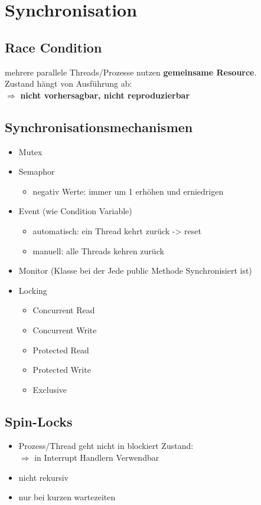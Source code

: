 \section{Synchronisation}

\subsection{Race Condition}
mehrere parallele Threads/Prozesse nutzen \textbf{gemeinsame Resource}.\\
Zustand hängt von Ausführung ab:\\
$\Rightarrow$ \textbf{nicht vorhersagbar, nicht reproduzierbar}

\subsection{Synchronisationsmechanismen}
\begin{itemize}
    \item Mutex
    \item Semaphor
    \begin{itemize}
        \item negativ Werte: immer um 1 erhöhen und erniedrigen
    \end{itemize}
    \item Event (wie Condition Variable)
    \begin{itemize}
        \item automatisch: ein Thread kehrt zurück -> reset
        \item manuell: alle Threads kehren zurück
    \end{itemize}
    \item Monitor (Klasse bei der Jede public Methode Synchronisiert ist)
    \item Locking
    \begin{itemize}
        \item Concurrent Read
        \item Concurrent Write
        \item Protected Read
        \item Protected Write
        \item Exclusive
    \end{itemize}
\end{itemize}

\subsection{Spin-Locks}
\begin{itemize}
    \item Prozess/Thread geht nicht in blockiert Zustand:\\
    $\Rightarrow$ in Interrupt Handlern Verwendbar
    \item nicht rekursiv
    \item nur bei kurzen wartezeiten    
\end{itemize}

